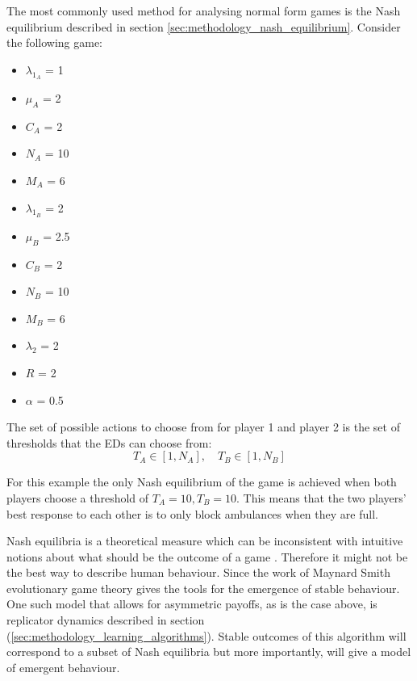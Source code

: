 The most commonly used method for analysing normal form games is the Nash 
equilibrium described in section \ref{sec:methodology_nash_equilibrium}.
Consider the following game:

\begin{multicols}{3}
    \begin{itemize}
        \item \( \lambda_{1_A} \) = 1
        \item \( \mu_A \) = 2
        \item \( C_A \) = 2
        \item \( N_A \) = 10
        \item \( M_A \) = 6
        \columnbreak

        \item \( \lambda_{1_B} \) = 2
        \item \( \mu_B \) = 2.5
        \item \( C_B \) = 2
        \item \( N_B \) = 10
        \item \( M_B \) = 6
        \columnbreak

        \item \( \lambda_2 \) = 2
        \item \( R \) = 2
        \item \( \alpha \) = 0.5
    \end{itemize}
\end{multicols}

The set of possible actions to choose from for player 1 and player 2 is the
set of thresholds that the EDs can choose from: 
\begin{equation}
    T_A \in [1, N_A], \quad T_B \in [1, N_B]
\end{equation}

For this example the only Nash equilibrium of the game is achieved when both 
players choose a threshold of \( T_A = 10, T_B = 10 \).
This means that the two players' best response to each other is to only block
ambulances when they are full. 

Nash equilibria is a theoretical measure which can be
inconsistent with intuitive notions about what should be the outcome of a 
game \cite{myerson1978refinements}.
Therefore it might not be the best way to describe human behaviour.
Since the work of Maynard Smith \cite{smith1986evolutionary} evolutionary game 
theory gives the tools for the emergence of stable behaviour.
One such model that allows for asymmetric payoffs, as is the case above, is 
replicator dynamics described in section 
(\ref{sec:methodology_learning_algorithms}).
Stable outcomes of this algorithm will correspond to a subset of Nash
equilibria but more importantly, will give a model of emergent behaviour. 

